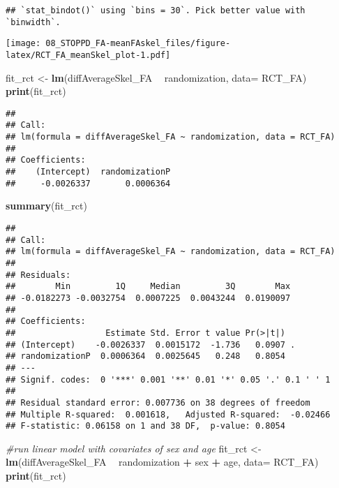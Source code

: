 \documentclass[]{article}
\newenvironment{Shaded}{\begin{snugshade}}{\end{snugshade}}
\newcommand{\KeywordTok}[1]{\textcolor[rgb]{0.13,0.29,0.53}{\textbf{#1}}}
\newcommand{\DataTypeTok}[1]{\textcolor[rgb]{0.13,0.29,0.53}{#1}}
\newcommand{\StringTok}[1]{\textcolor[rgb]{0.31,0.60,0.02}{#1}}
\newcommand{\CommentTok}[1]{\textcolor[rgb]{0.56,0.35,0.01}{\textit{#1}}}
\newcommand{\OperatorTok}[1]{\textcolor[rgb]{0.81,0.36,0.00}{\textbf{#1}}}
\newcommand{\NormalTok}[1]{#1}
\theoremstyle{definition}
\theoremstyle{definition}
\theoremstyle{definition}
\theoremstyle{remark}
\begin{document}
\begin{verbatim}
## `stat_bindot()` using `bins = 30`. Pick better value with `binwidth`.
\end{verbatim}

\texttt{[image: 08\_STOPPD\_FA-meanFAskel\_files/figure-latex/RCT\_FA\_meanSkel\_plot-1.pdf]}

\begin{Shaded}
\begin{Highlighting}[]
\NormalTok{fit_rct <-}\StringTok{ }\KeywordTok{lm}\NormalTok{(diffAverageSkel_FA }\OperatorTok{~}\StringTok{ }\NormalTok{randomization, }\DataTypeTok{data=}\NormalTok{ RCT_FA)}
\KeywordTok{print}\NormalTok{(fit_rct)}
\end{Highlighting}
\end{Shaded}

\begin{verbatim}
## 
## Call:
## lm(formula = diffAverageSkel_FA ~ randomization, data = RCT_FA)
## 
## Coefficients:
##    (Intercept)  randomizationP  
##     -0.0026337       0.0006364
\end{verbatim}

\begin{Shaded}
\begin{Highlighting}[]
\KeywordTok{summary}\NormalTok{(fit_rct)}
\end{Highlighting}
\end{Shaded}

\begin{verbatim}
## 
## Call:
## lm(formula = diffAverageSkel_FA ~ randomization, data = RCT_FA)
## 
## Residuals:
##        Min         1Q     Median         3Q        Max 
## -0.0182273 -0.0032754  0.0007225  0.0043244  0.0190097 
## 
## Coefficients:
##                  Estimate Std. Error t value Pr(>|t|)  
## (Intercept)    -0.0026337  0.0015172  -1.736   0.0907 .
## randomizationP  0.0006364  0.0025645   0.248   0.8054  
## ---
## Signif. codes:  0 '***' 0.001 '**' 0.01 '*' 0.05 '.' 0.1 ' ' 1
## 
## Residual standard error: 0.007736 on 38 degrees of freedom
## Multiple R-squared:  0.001618,   Adjusted R-squared:  -0.02466 
## F-statistic: 0.06158 on 1 and 38 DF,  p-value: 0.8054
\end{verbatim}

\begin{Shaded}
\begin{Highlighting}[]
\CommentTok{#run linear model with covariates of sex and age}
\NormalTok{fit_rct <-}\StringTok{ }\KeywordTok{lm}\NormalTok{(diffAverageSkel_FA }\OperatorTok{~}\StringTok{ }\NormalTok{randomization }\OperatorTok{+}\StringTok{ }\NormalTok{sex }\OperatorTok{+}\StringTok{ }\NormalTok{age, }\DataTypeTok{data=}\NormalTok{ RCT_FA)}
\KeywordTok{print}\NormalTok{(fit_rct)}
\end{Highlighting}
\end{Shaded}
\end{document}
